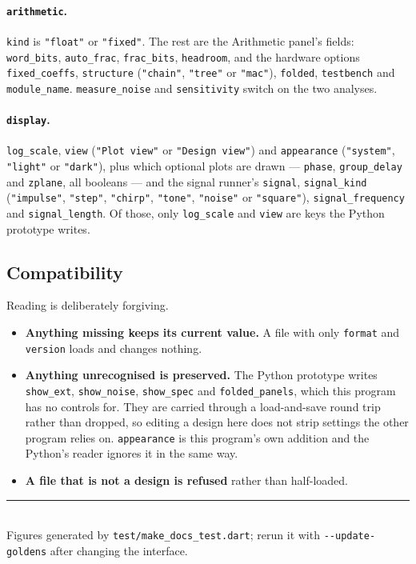 \documentclass[11pt,a4paper]{article}
\newcommand{\lit}[1]{\texttt{#1}}
\begin{document}
\paragraph{\lit{arithmetic}.} \lit{kind} is \lit{"float"} or \lit{"fixed"}. The
rest are the Arithmetic panel's fields: \lit{word\_bits}, \lit{auto\_frac},
\lit{frac\_bits}, \lit{headroom}, and the hardware options \lit{fixed\_coeffs},
\lit{structure} (\lit{"chain"}, \lit{"tree"} or \lit{"mac"}), \lit{folded},
\lit{testbench} and \lit{module\_name}. \lit{measure\_noise} and
\lit{sensitivity} switch on the two analyses.

\paragraph{\lit{display}.} \lit{log\_scale}, \lit{view} (\lit{"Plot view"} or
\lit{"Design view"}) and \lit{appearance} (\lit{"system"}, \lit{"light"} or
\lit{"dark"}), plus which optional plots are drawn --- \lit{phase},
\lit{group\_delay} and \lit{zplane}, all booleans --- and the signal runner's
\lit{signal}, \lit{signal\_kind} (\lit{"impulse"}, \lit{"step"}, \lit{"chirp"},
\lit{"tone"}, \lit{"noise"} or \lit{"square"}), \lit{signal\_frequency} and
\lit{signal\_length}. Of those, only \lit{log\_scale} and \lit{view} are keys
the Python prototype writes.

\subsection{Compatibility}

Reading is deliberately forgiving.

\begin{itemize}[leftmargin=*]
  \item \textbf{Anything missing keeps its current value.} A file with only
        \lit{format} and \lit{version} loads and changes nothing.
  \item \textbf{Anything unrecognised is preserved.} The Python prototype
        writes \lit{show\_ext}, \lit{show\_noise}, \lit{show\_spec} and
        \lit{folded\_panels}, which this program has no controls for. They are
        carried through a load-and-save round trip rather than dropped, so
        editing a design here does not strip settings the other program relies
        on. \lit{appearance} is this program's own addition and the Python's
        reader ignores it in the same way.
  \item \textbf{A file that is not a design is refused} rather than
        half-loaded.
\end{itemize}

\vfill
\noindent\rule{\textwidth}{0.4pt}\\
{\small Figures generated by \lit{test/make\_docs\_test.dart}; rerun it with
\lit{-{}-update-goldens} after changing the interface.}
\end{document}
